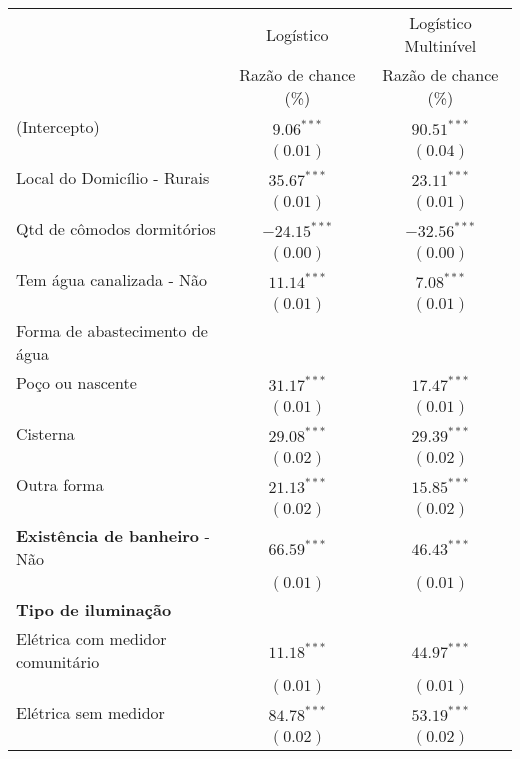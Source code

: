 \documentclass[a4paper, 12pt, openright, oneside, english, brazil, article]{abntex2}
\begin{document}
		\begin{table}[!h]
			{\begin{tabular}{l c c}
				\hline
				& Logístico & Logístico Multinível \\
				& Razão de chance (\%)  & Razão de chance (\%) \\
				\hline
				(Intercepto)                                                 & $9.06^{***}$  & $90.51^{***}$  \\
				& $(0.01)$      & $(0.04)$      \\
				Local do Domicílio - Rurais                                & $35.67^{***}$  & $23.11^{***}$  \\
				& $(0.01)$      & $(0.01)$      \\
				Qtd de cômodos dormitórios                               & $-24.15^{***}$ & $-32.56^{***}$ \\
				& $(0.00)$      & $(0.00)$      \\
				Tem água canalizada - Não                               & $11.14^{***}$  & $7.08^{***}$  \\
				& $(0.01)$      & $(0.01)$      \\
				Forma de abastecimento de água &   &   \\
				Poço ou nascente               & $31.17^{***}$  & $17.47^{***}$  \\
				& $(0.01)$      & $(0.01)$      \\
				Cisterna                       & $29.08^{***}$  & $29.39^{***}$  \\
				& $(0.02)$      & $(0.02)$      \\
				Outra forma                    & $21.13^{***}$  & $15.85^{***}$  \\
				& $(0.02)$      & $(0.02)$      \\
				\textbf{Existência de banheiro} - Não                 & $66.59^{***}$  & $46.43^{***}$  \\
				& $(0.01)$      & $(0.01)$      \\
				\textbf{Tipo de iluminação}   &    &    \\
				Elétrica com medidor comunitário & $11.18^{***}$  & $44.97^{***}$  \\
				& $(0.01)$      & $(0.01)$      \\
				Elétrica sem medidor             & $84.78^{***}$  & $53.19^{***}$  \\
				& $(0.02)$      & $(0.02)$      \\

\end{tabular}}
\end{table}
\end{document}
